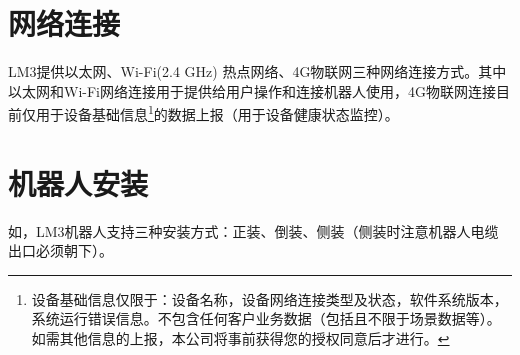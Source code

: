 \section{网络连接}

LM3提供以太网、Wi-Fi(2.4 GHz) 热点网络、4G物联网三种网络连接方式。其中以太网和Wi-Fi网络连接用于提供给用户操作和连接机器人使用，4G物联网连接目前仅用于设备基础信息\footnote{设备基础信息仅限于：设备名称，设备网络连接类型及状态，软件系统版本，系统运行错误信息。不包含任何客户业务数据（包括且不限于场景数据等）。如需其他信息的上报，本公司将事前获得您的授权同意后才进行。}的数据上报（用于设备健康状态监控）。



\section{机器人安装}

如，LM3机器人支持三种安装方式：正装、倒装、侧装（侧装时注意机器人电缆出口必须朝下）。

